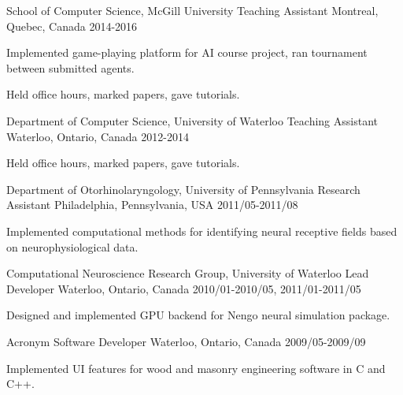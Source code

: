 \begin{cventries}
  \cventry
    {School of Computer Science, McGill University}
    {Teaching Assistant}
    {Montreal, Quebec, Canada}
    {2014-2016}
    {
      \begin{cvitems}
        \item {Implemented game-playing platform for AI course project, ran tournament between submitted agents.}
        \item {Held office hours, marked papers, gave tutorials.}
      \end{cvitems}
    }
   \cventry
    {Department of Computer Science, University of Waterloo}
    {Teaching Assistant}
    {Waterloo, Ontario, Canada}
    {2012-2014}
    {
      \begin{cvitems}
        \item {Held office hours, marked papers, gave tutorials.}
      \end{cvitems}
    }
  \cventry
    {Department of Otorhinolaryngology, University of Pennsylvania}
    {Research Assistant}
    {Philadelphia, Pennsylvania, USA}
    {2011/05-2011/08}
    {
      \begin{cvitems}
        \item {Implemented computational methods for identifying neural receptive fields based on neurophysiological data.}
      \end{cvitems}
    }
   \cventry
    {Computational Neuroscience Research Group, University of Waterloo}
    {Lead Developer}
    {Waterloo, Ontario, Canada}
    {2010/01-2010/05, 2011/01-2011/05}
    {
      \begin{cvitems}
        \item {Designed and implemented GPU backend for Nengo neural simulation package.}
      \end{cvitems}
    }
   \cventry
    {Acronym Software}
    {Developer}
    {Waterloo, Ontario, Canada}
    {2009/05-2009/09}
    {
      \begin{cvitems}
        \item {Implemented UI features for wood and masonry engineering software in C and C++.}
      \end{cvitems}
    }


\end{cventries}
